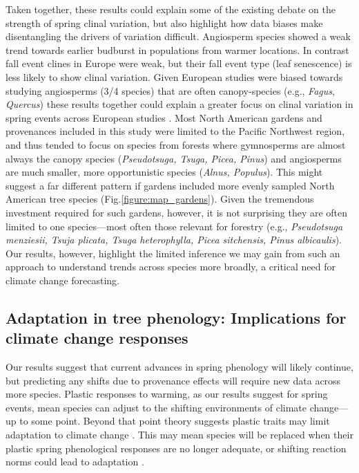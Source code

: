 \documentclass{article}
\begin{document}
Taken together, these results could explain some of the existing debate on the strength of spring clinal variation, but also highlight how data biases make disentangling the drivers of variation difficult. Angiosperm species showed a weak trend towards earlier budburst in populations from warmer locations. In contrast fall event clines in Europe were weak, but their fall event type (leaf senescence) is less likely to show clinal variation. Given European studies were biased towards studying angiosperms (3/4 species) that are often canopy-species (e.g., \emph{Fagus}, \emph{Quercus}) these results together could explain a greater focus on clinal variation in spring events across European studies \citep{Basler:2012,gauzere2020,sog08,deans96,von95}. Most North American gardens and provenances included in this study were limited to the Pacific Northwest region, and thus tended to focus on species from forests where gymnosperms are almost always the canopy species (\emph{Pseudotsuga, Tsuga, Picea, Pinus}) and angiosperms are much smaller, more opportunistic species (\emph{Alnus, Populus}). This might suggest a far different pattern if gardens included more evenly sampled North American tree species (Fig.\ref{figure:map_gardens}). Given the tremendous investment required for such gardens, however, it is not surprising they are often limited to one species---most often those relevant for forestry (e.g., \emph{Pseudotsuga menziesii, Tsuja plicata, Tsuga heterophylla, Picea sitchensis, Pinus albicaulis}). Our results, however, highlight the limited inference we may gain from such an approach to understand trends across species more broadly, a critical need for climate change forecasting.

\subsection{Adaptation in tree phenology: Implications for climate change responses}

Our results suggest that current advances in spring phenology will likely continue, but predicting any shifts due to provenance effects will require new data across more species. Plastic responses to warming, as our results suggest for spring events, mean species can adjust to the shifting environments of climate change---up to some point. Beyond that point theory suggests plastic traits may limit adaptation to climate change \citep{chevin10}. This may mean species will be replaced when their plastic spring phenological responses are no longer adequate, or shifting reaction norms could lead to adaptation \citep{gauzere2020}. 
\end{document}
